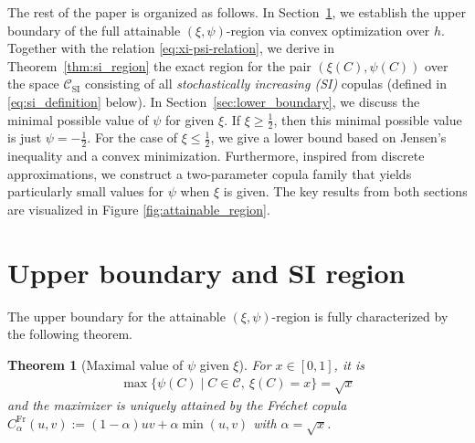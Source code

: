 \documentclass{article}
\newtheorem{theorem}{Theorem}[section]
\newcommand{\1}{\mathds{1}}
\newcommand{\CC}{\mathcal{C}}  %
\begin{document}
The rest of the paper is organized as follows.
In Section~\ref{sec:attainable_region}, we establish the upper boundary of the full attainable $(\xi,\psi)$-region via convex optimization over $h$.
Together with the relation \eqref{eq:xi-psi-relation}, we derive in Theorem~\ref{thm:si_region} the exact region for the pair \((\xi(C), \psi(C))\) over the space \(\CC_{\text{SI}}\) consisting of all \emph{stochastically increasing (SI)} copulas (defined in \eqref{eq:si_definition} below).
In Section~\ref{sec:lower_boundary}, we discuss the minimal possible value of $\psi$ for given $\xi$.
If $\xi\ge\frac12$, then this minimal possible value is just $\psi=-\frac12$.
For the case of $\xi\le\frac12$, we give a lower bound based on Jensen's inequality and a convex minimization.
Furthermore, inspired from discrete approximations, we construct a two-parameter copula family that yields particularly small values for $\psi$ when $\xi$ is given.
The key results from both sections are visualized in Figure \ref{fig:attainable_region}.

\section{Upper boundary and SI region}
\label{sec:attainable_region}
The upper boundary for the attainable $(\xi,\psi)$-region is fully characterized by the following theorem.

\begin{theorem}[Maximal value of $\psi$ given $\xi$]\label{thm:exact_region_upper_bound}
For $x\in[0,1]$, it is
\begin{align}\label{eq:exact_region_upper_bound}
    \max\{\psi(C) \mid C \in \CC,~\xi(C) = x\} = \sqrt{x}
\end{align}
and the maximizer is uniquely attained by the Fréchet copula \(C^{\text{Fr}}_\alpha(u,v) := (1-\alpha)uv + \alpha \min(u,v)\) with \(\alpha = \sqrt{x}\).
\end{theorem}
\end{document}
